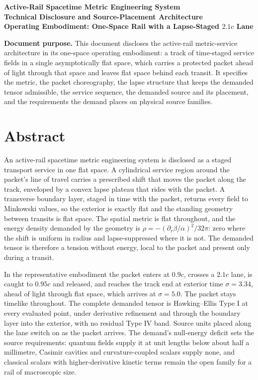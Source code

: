 \documentclass[11pt]{article}
\newcommand{\sig}{\sigma}
\begin{document}
\begin{center}
{\LARGE \bfseries Active-Rail Spacetime Metric Engineering System}\\[0.35em]
{\Large \bfseries Technical Disclosure and Source-Placement Architecture}\\[0.9em]
{\bfseries Operating Embodiment: One-Space Rail with a Lapse-Staged $2.1c$ Lane}\\[0.8em]
\end{center}

\noindent\textbf{Document purpose.} This document discloses the active-rail metric-service architecture in its one-space operating embodiment: a track of time-staged service fields in a single asymptotically flat space, which carries a protected packet ahead of light through that space and leaves flat space behind each transit. It specifies the metric, the packet choreography, the lapse structure that keeps the demanded tensor admissible, the service sequence, the demanded source and its placement, and the requirements the demand places on physical source families.

\section{Abstract}

An active-rail spacetime metric engineering system is disclosed as a staged transport service in one flat space. A cylindrical service region around the packet's line of travel carries a prescribed shift that moves the packet along the track, enveloped by a convex lapse plateau that rides with the packet. A transverse boundary layer, staged in time with the packet, returns every field to Minkowski values, so the exterior is exactly flat and the standing geometry between transits is flat space. The spatial metric is flat throughout, and the energy density demanded by the geometry is $\rho=-(\partial_r\beta/\alpha)^2/32\pi$: zero where the shift is uniform in radius and lapse-suppressed where it is not. The demanded tensor is therefore a tension without energy, local to the packet and present only during a transit.

In the representative embodiment the packet enters at $0.9c$, crosses a $2.1c$ lane, is caught to $0.95c$ and released, and reaches the track end at exterior time $\sig=3.34$, ahead of light through flat space, which arrives at $\sig=5.0$. The packet stays timelike throughout. The complete demanded tensor is Hawking--Ellis Type I at every evaluated point, under derivative refinement and through the boundary layer into the exterior, with no residual Type IV band. Source units placed along the lane switch on as the packet arrives. The demand's null-energy deficit sets the source requirements: quantum fields supply it at unit lengths below about half a millimetre, Casimir cavities and curvature-coupled scalars supply none, and classical scalars with higher-derivative kinetic terms remain the open family for a rail of macroscopic size.
\end{document}
